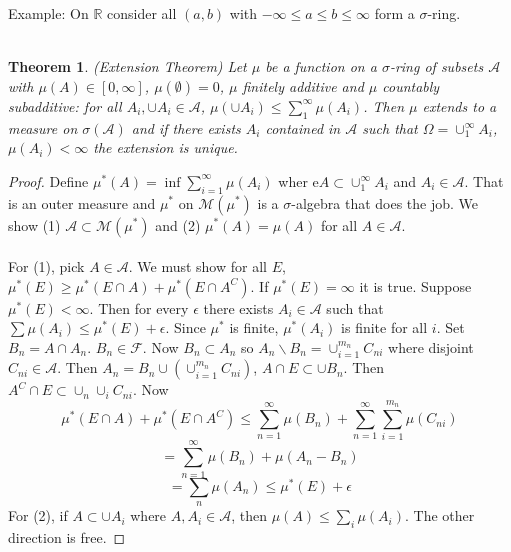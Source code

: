 \documentclass[12pt]{article}
\newtheorem{theorem}{Theorem}
\begin{document}
Example: On $\mathbb{R}$ consider all $(a, b)$ with $-\infty \le a \le b \le \infty$ form a $\sigma$-ring.
\\ \\
\begin{theorem}
(Extension Theorem) Let $\mu$ be a function on a $\sigma$-ring of subsets $\mathcal{A}$ with $\mu(A) \in [0, \infty]$, $\mu(\emptyset) = 0$, $\mu$ finitely additive and $\mu$ countably subadditive: for all $A_i, \cup A_i \in \mathcal{A}$, $\mu(\cup A_i) \le \sum_1^\infty \mu(A_i)$.  Then $\mu$ extends to a measure on $\sigma(\mathcal{A})$ and if there exists $A_i$ contained in $\mathcal{A}$ such that $\Omega = \cup_1^\infty A_i$, $\mu(A_i) < \infty$ the extension is unique.
\end{theorem}
\begin{proof}
Define $\mu^*(A) = \inf \sum_{i=1}^\infty \mu(A_i)$ wher e$A \subset \cup_1^\infty A_i$ and $A_i \in \mathcal{A}$.  That is an outer measure and $\mu^*$ on $\mathcal{M}(\mu^*)$ is a $\sigma$-algebra that does the job.  We show (1) $\mathcal{A} \subset \mathcal{M}(\mu^*)$ and (2) $\mu^*(A) = \mu(A)$ for all $A \in \mathcal{A}$.
\\ \\
For (1), pick $A \in \mathcal{A}$.  We must show for all $E$, $\mu^*(E) \ge \mu^*(E \cap A) + \mu^*(E \cap A^C)$.  If $\mu^*(E) = \infty$ it is true.  Suppose $\mu^*(E) < \infty$.  Then for every $\epsilon$ there exists $A_i \in \mathcal{A}$ such that $\sum \mu(A_i) \le \mu^*(E) + \epsilon$.  Since $\mu^*$ is finite, $\mu^*(A_i)$ is finite for all $i$.  Set $B_n = A \cap A_n$. $B_n \in \mathcal{F}$.  Now $B_n \subset A_n$ so $A_n \backslash B_n = \cup_{i=1}^{m_n} C_{ni}$ where disjoint $C_{ni} \in \mathcal{A}$.  Then $A_n = B_n \cup (\cup_{i=1}^{m_n} C_{ni})$, $A \cap E \subset \cup B_n$.  Then $A^C \cap  E \subset \cup_n \cup_i C_{ni}$.  Now 
$$\mu^*(E \cap A) + \mu^*(E \cap A^C) \le \sum_{n=1}^\infty \mu(B_n) + \sum_{n=1}^\infty \sum_{i=1}^{m_n} \mu(C_{ni})$$
$$ = \sum_{n=1}^\infty \mu(B_n) + \mu(A_n - B_n)$$
$$ = \sum_n \mu(A_n) \le \mu^*(E) + \epsilon$$
For (2), if $A \subset \cup A_i$ where $A, A_i \in \mathcal{A}$, then $\mu(A) \le \sum_i \mu(A_i)$.  The other direction is free.
\end{proof}
\end{document}
